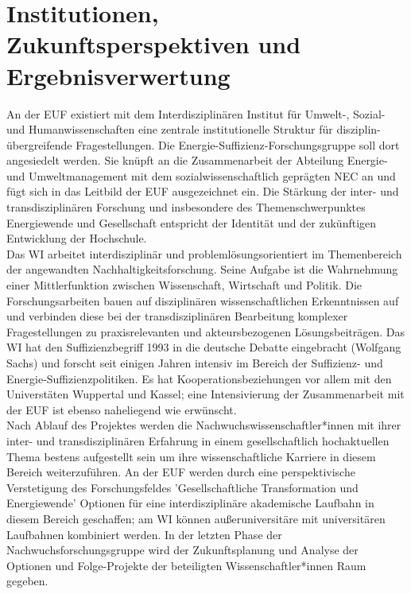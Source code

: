 \documentclass[a4paper,11pt,twoside]{scrartcl}
\begin{document}
\section{Institutionen, Zukunftsperspektiven und Ergebnisverwertung}
An der EUF existiert mit dem Interdisziplinären Institut für Umwelt-, Sozial- und Humanwissenschaften eine zentrale institutionelle Struktur für disziplin-übergreifende Fragestellungen. Die Energie-Suffizienz-Forschungsgruppe soll dort angesiedelt werden. Sie knüpft an die Zusammenarbeit der Abteilung Energie- und Umweltmanagement mit dem sozialwissenschaftlich geprägten NEC an und fügt sich in das Leitbild der EUF ausgezeichnet ein. Die Stärkung der inter- und transdisziplinären Forschung und insbesondere des Themenschwerpunktes Energiewende und Gesellschaft entspricht der Identität und der zukünftigen Entwicklung der Hochschule.\\
Das WI arbeitet interdisziplinär und problemlösungsorientiert im Themenbereich der angewandten Nachhaltigkeitsforschung. Seine Aufgabe ist die Wahrnehmung einer Mittlerfunktion zwischen Wissenschaft, Wirtschaft und Politik. Die Forschungsarbeiten bauen auf disziplinären wissenschaftlichen Erkenntnissen auf und verbinden diese bei der transdisziplinären Bearbeitung komplexer Fragestellungen zu praxisrelevanten und akteursbezogenen Lösungsbeiträgen. Das WI hat den Suffizienzbegriff 1993 in die deutsche Debatte eingebracht (Wolfgang Sachs) und forscht seit einigen Jahren intensiv im Bereich der Suffizienz- und Energie-Suffizienzpolitiken. Es hat Kooperationsbeziehungen vor allem mit den Universtäten Wuppertal und Kassel; eine Intensivierung der Zusammenarbeit mit der EUF ist ebenso naheliegend wie erwünscht.\\
Nach Ablauf des Projektes werden die Nachwuchswissenschaftler*innen mit ihrer inter- und transdisziplinären Erfahrung in einem gesellschaftlich hochaktuellen Thema bestens aufgestellt sein um ihre wissenschaftliche Karriere in diesem Bereich weiterzuführen. An der EUF werden durch eine perspektivische Verstetigung des Forschungsfeldes 'Gesellschaftliche Transformation und Energiewende' Optionen für eine interdisziplinäre akademische Laufbahn in diesem Bereich geschaffen; am WI können außeruniversitäre mit universitären Laufbahnen kombiniert werden. In der letzten Phase der Nachwuchsforschungsgruppe wird der Zukunftsplanung und Analyse der Optionen und Folge-Projekte der beteiligten Wissenschaftler*innen Raum gegeben.\\
\end{document}
